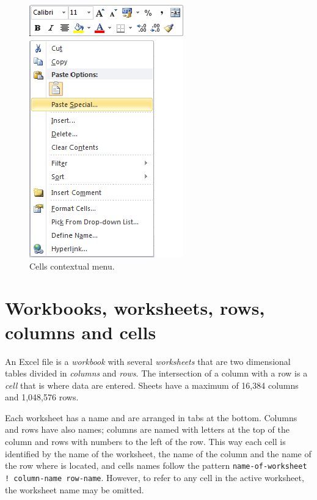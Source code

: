 \begin{figure}[htbp]
\begin{center}
\includegraphics[scale=0.7]{../img/contextual_menu.png}
\end{center}
\caption{Cells contextual menu.}
\label{img-contextual_menu}
\end{figure}

\section{Workbooks, worksheets, rows, columns and cells}\hypertarget{workbooks-worksheets-rows-columns-and-cells}{}\label{workbooks-worksheets-rows-columns-and-cells}

An Excel file is a \emph{workbook} with several \emph{worksheets} that are two dimensional tables divided in \emph{columns} and \emph{rows}. The intersection of a column with a row is a \emph{cell} that is where data are entered. Sheets have a maximum of 16,384 columns and 1,048,576 rows.

Each worksheet has a name and are arranged in tabs at the bottom. Columns and rows have also names; columns are named with letters at the top of the column and rows with numbers to the left of the row. This way each cell is identified by the name of the worksheet, the name of the column and the name of the row where is located, and cells names follow the pattern \texttt{name-of-worksheet ! column-name row-name}. However, to refer to any cell in the active worksheet, the worksheet name may be omitted.

